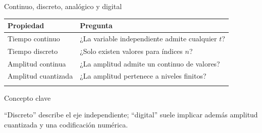 \documentclass[
  10pt,
  ignorenonframetext,
  aspectratio=169,
  spanish,
]{beamer}
\begin{document}
\begin{frame}{Continuo, discreto, analógico y digital}
\label{d1-027}
\begin{longtable}[]{@{}ll@{}}
\toprule\noalign{}
Propiedad & Pregunta \\
\midrule\noalign{}
\endhead
Tiempo continuo & ¿La variable independiente admite cualquier \(t\)? \\
Tiempo discreto & ¿Solo existen valores para índices \(n\)? \\
Amplitud continua & ¿La amplitud admite un continuo de valores? \\
Amplitud cuantizada & ¿La amplitud pertenece a niveles finitos? \\
\bottomrule\noalign{}
\end{longtable}

\begin{block}{Concepto clave}

``Discreto'' describe el eje independiente; ``digital'' suele implicar
además amplitud cuantizada y una codificación numérica.

\end{block}

\end{frame}
\end{document}
